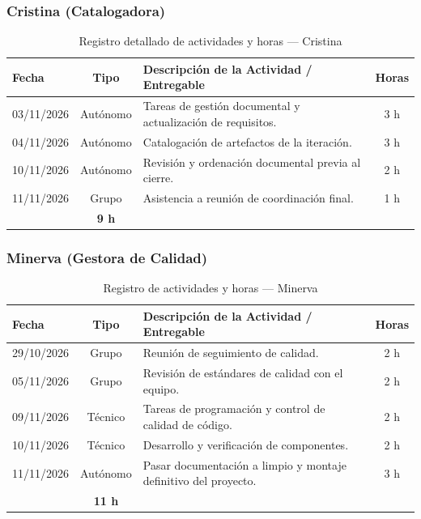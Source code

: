 \subsubsection{Cristina (Catalogadora)}
\begin{table}[H]
\centering
\small
{}
\begin{tabularx}{\textwidth}{l c X c}
\toprule
\rowcolor{verdeApagado}
\textbf{\color{textoOscuro}Fecha} & \textbf{\color{textoOscuro}Tipo} & \textbf{\color{textoOscuro}Descripción de la Actividad / Entregable} & \textbf{\color{textoOscuro}Horas} \\
\midrule
03/11/2026 & Autónomo & Tareas de gestión documental y actualización de requisitos. & 3 h \\
04/11/2026 & Autónomo & Catalogación de artefactos de la iteración. & 3 h \\
10/11/2026 & Autónomo & Revisión y ordenación documental previa al cierre. & 2 h \\
11/11/2026 & Grupo & Asistencia a reunión de coordinación final. & 1 h \\
\midrule
\rowcolor{azulclaro!60}
\multicolumn{3}{l}{\textbf{\color{textoOscuro}Total Horas Dedicadas — Cristina:}} & \textbf{\color{textoOscuro}9 h} \\
\bottomrule
\end{tabularx}
\caption{Registro detallado de actividades y horas — Cristina}
\end{table}

\subsubsection{Minerva (Gestora de Calidad)}
\begin{table}[H]
\centering
\small
{}
\begin{tabularx}{\textwidth}{l c X c}
\toprule
\rowcolor{verdeApagado}
\textbf{\color{textoOscuro}Fecha} & \textbf{\color{textoOscuro}Tipo} & \textbf{\color{textoOscuro}Descripción de la Actividad / Entregable} & \textbf{\color{textoOscuro}Horas} \\
\midrule
29/10/2026 & Grupo & Reunión de seguimiento de calidad. & 2 h \\
05/11/2026 & Grupo & Revisión de estándares de calidad con el equipo. & 2 h \\
09/11/2026 & Técnico & Tareas de programación y control de calidad de código. & 2 h \\
10/11/2026 & Técnico & Desarrollo y verificación de componentes. & 2 h \\
11/11/2026 & Autónomo & Pasar documentación a limpio y montaje definitivo del proyecto. & 3 h \\
\midrule
\rowcolor{azulclaro!60}
\multicolumn{3}{l}{\textbf{\color{textoOscuro}Total Horas Dedicadas — Minerva:}} & \textbf{\color{textoOscuro}11 h} \\
\bottomrule
\end{tabularx}
\caption{Registro de actividades y horas — Minerva}
\end{table}

